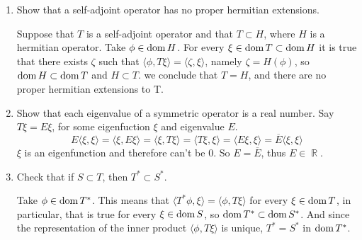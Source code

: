\documentclass{article}
\theoremstyle{exercisestyle}
\newenvironment{exercise}[1]
  {\renewcommand\theinnerex{#1}\innerex}
  {\endinnerex}
\DeclareMathOperator{\Real}{\mathbb{R}}
\newcommand{\inner}[2]{\langle #1, #2 \rangle}
\begin{document}
\begin{exercise}{2.1.19}
    \begin{enumerate}
        \item Show that a self-adjoint operator has no proper hermitian extensions.

              Suppose that $T$ is a self-adjoint operator and that $T \subset H$, where $H$ is a hermitian operator. Take $\phi \in \operatorname{dom} H$. For every $\xi \in \operatorname{dom} T \subset \operatorname{dom} H$
              it is true that there exists $\zeta$ such that $\inner{\phi}{T \xi} = \inner{\zeta}{\xi}$, namely $\zeta = H(\phi)$, so $\operatorname{dom} H \subset \operatorname{dom} T$ and $H \subset T$. we
              conclude that $T = H$, and there are no proper hermitian extensions to T.

        \item Show that each eigenvalue of a symmetric operator is a real number.
              Say $T \xi = E \xi$, for some eigenfuction $\xi$ and eigenvalue $E$.
              $$ E \inner{\xi}{\xi} = \inner{\xi}{E\xi} = \inner{\xi}{T\xi} = \inner{T\xi}{\xi} = \inner{E\xi}{\xi} = \overline{E}\inner{\xi}{\xi}$$
              $\xi$ is an eigenfunction and therefore can't be 0. So $E = \overline{E}$, thus $E \in \Real$.

        \item Check that if $S \subset T$, then $T^* \subset S^*$.

              Take $\phi \in \operatorname{dom} T^*$. This means that $\inner{T^*\phi}{\xi} = \inner{\phi}{T \xi}$ for every $\xi \in \operatorname{dom} T$, in particular, that is true for every $\xi \in \operatorname{dom} S$,
              so $\operatorname{dom} T^* \subset \operatorname{dom} S^*$. And since the representation of the inner product $\inner{\phi}{T \xi}$ is unique, $T^* = S^*$ in $\operatorname{dom} T^*$.
    \end{enumerate}

\end{exercise}
\end{document}
